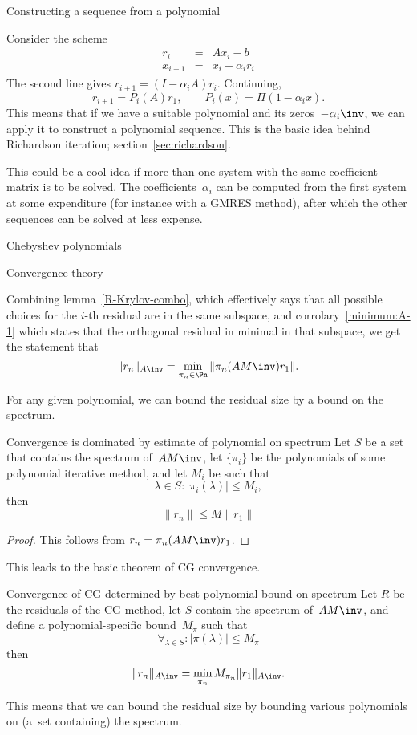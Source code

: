 \documentclass[11pt]{artikel3}
\begin{document}
\begin{Outline}
 {Constructing a sequence from a polynomial}

Consider the scheme
\begin{eqnarray*}
r_i&=&Ax_i-b\\
x_{i+1}&=&x_i-\alpha_ir_i
\end{eqnarray*}
The second line gives $r_{i+1}=(I-\alpha_iA)r_i$. Continuing,
\[ r_{i+1}=P_i(A)r_1,\qquad P_i(x)=\Pi(1-\alpha_ix). \]
This means that if we have a suitable polynomial and its
zeros~$-\alpha_i\inv$, we can apply it to construct a polynomial
sequence. This is the basic idea behind Richardson iteration;
section~\ref{sec:richardson}.

This could be a cool idea if more than one system with the same
coefficient matrix is to be solved. The coefficients~$\alpha_i$ can be
computed from the first system at some expenditure (for instance with
a GMRES method), after which the other sequences can be solved at less
expense.

 {Chebyshev polynomials}
\label{sec:cheby}



 {Convergence theory}
\label{sec:convergence}

Combining lemma~\ref{R-Krylov-combo}, which effectively says that all
possible choices for the $i$-th residual are in the same subspace, and
corrolary~\ref{minimum:A-1} which states that the orthogonal residual
in minimal in that subspace, we get the statement that
\[ \|r_n\|_{A\inv}=\min_{\pi_n\in\Pn} \|\pi_n(AM\inv)r_1\|. \]

For any given polynomial, we can bound the residual size by a bound on
the spectrum.
\begin{llemma}{Convergence is dominated by estimate of polynomial on
    spectrum}
Let $S$ be a set that contains the spectrum of~$AM\inv$, 
let $\{\pi_i\}$ be the polynomials of some polynomial iterative
method, and let $M_i$ be such that
\[ \lambda\in S\colon|\pi_i(\lambda)|\leq M_i, \]
then
\[ \|r_n\| \leq M\|r_1\| \]
\end{llemma}
\begin{proof} This follows from $r_n=\pi_n(AM\inv)r_1$. \end{proof}

This leads to the basic theorem of CG convergence.
\begin{ttheorem}{Convergence of CG determined by best polynomial bound
    on spectrum}
\label{th:spectrum-bound}
Let $R$ be the residuals of the CG method, let $S$ contain the
spectrum of~$AM\inv$, and define a polynomial-specific bound~$M_\pi$
such that \[ \forall_{\lambda\in S}\colon|\pi(\lambda)|\leq M_{\pi} \]
then
\[ \|r_n\|_{A\inv}=\min_{\pi_n}M_{\pi_n}\|r_1\|_{A\inv}. \]
\end{ttheorem}
This means that we can bound the residual size by bounding various
polynomials on (a~set containing) the spectrum.


\end{Outline}
\end{document}
